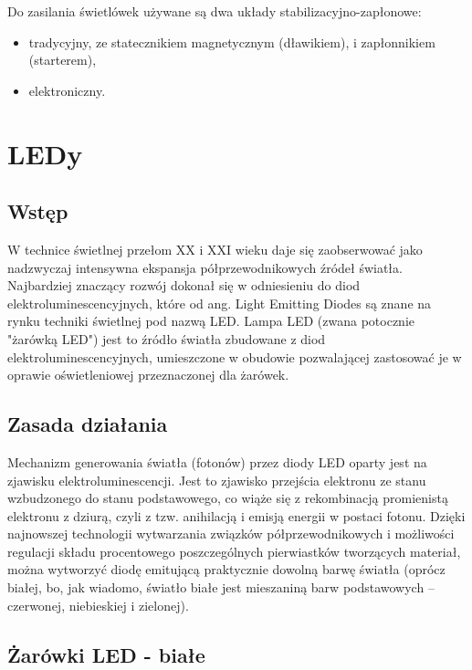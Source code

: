 \documentclass[12pt,a4paper]{book}
\begin{document}
\noindent
Do zasilania świetlówek używane są dwa układy stabilizacyjno-zapłonowe:

\begin{itemize}
\item tradycyjny, ze statecznikiem magnetycznym (dławikiem), i zapłonnikiem (starterem),
\item elektroniczny.
\end{itemize}

\chapter{LEDy}

\section*{Wstęp}

W technice świetlnej przełom XX i XXI wieku daje się zaobserwować jako nadzwyczaj intensywna ekspansja półprzewodnikowych źródeł światła. Najbardziej znaczący rozwój dokonał się w odniesieniu do diod elektroluminescencyjnych, które od ang. Light Emitting Diodes są znane na rynku techniki świetlnej pod nazwą LED. Lampa LED (zwana potocznie "żarówką LED") jest to źródło światła zbudowane z diod elektroluminescencyjnych, umieszczone w obudowie pozwalającej zastosować je w oprawie oświetleniowej przeznaczonej dla żarówek.

\section*{Zasada działania}

Mechanizm generowania światła (fotonów) przez diody LED oparty jest na zjawisku elektroluminescencji. Jest to zjawisko przejścia elektronu ze stanu wzbudzonego do stanu podstawowego, co wiąże się z rekombinacją promienistą elektronu z dziurą, czyli z tzw. anihilacją i emisją energii w postaci fotonu. Dzięki najnowszej technologii wytwarzania związków półprzewodnikowych i możliwości regulacji składu procentowego poszczególnych pierwiastków tworzących materiał, można wytworzyć diodę emitującą praktycznie dowolną barwę światła (oprócz białej, bo, jak wiadomo, światło białe jest mieszaniną barw podstawowych – czerwonej, niebieskiej i zielonej).

\section*{Żarówki LED - białe}
\end{document}
